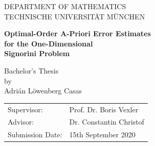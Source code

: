 \documentclass[headsepline,footsepline,footinclude=false,oneside,fontsize=11pt,paper=a4,listof=totoc,bibliography=totoc]{scrbook} %
\begin{document}
\pagestyle{empty}       %
\parbox{1.5cm}{}\hspace{310pt}%
\parbox{1.5cm}{}%
\vspace*{1.5cm}
\begin{center}
	{\huge \MakeUppercase{Department of Mathematics}} 
	\\
	\vspace*{5mm}
	{\large \MakeUppercase{Technische Universität München} }
	\\
	\vspace*{2cm}
	{\huge {\textbf{{Optimal-Order A-Priori Error Estimates} \\ for the
				One-Dimensional\\ Signorini Problem}\par}}
	\vspace*{2cm}
	{\Large Bachelor's Thesis}\linebreak \\ 
	{\Large by}\linebreak \\
	{\Large Adrián Löwenberg Casas}\\
	\vspace*{1.8cm}
	{\large 
		\begin{tabular}{ll}
			Supervisor: & Prof. Dr. Boris Vexler\\
			Advisor: & Dr. Constantin Christof\\
			Submission Date: & 15th September 2020
		\end{tabular}
	}
\end{center}
\newpage    %
\end{document}
